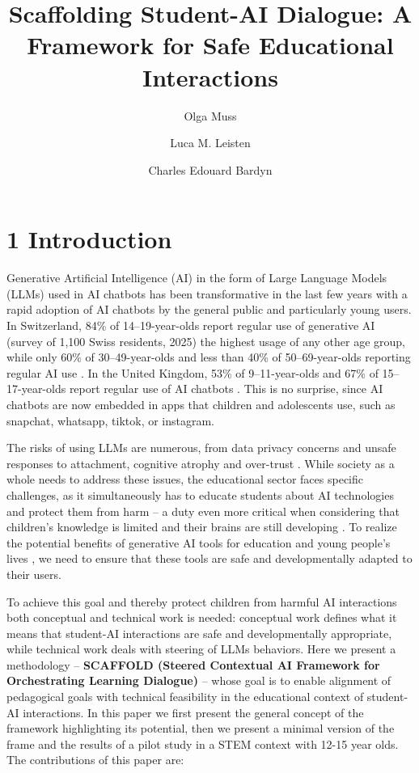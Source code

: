 \documentclass[fleqn,10pt]{wlscirep}
\title{Scaffolding Student-AI Dialogue: A Framework for Safe Educational Interactions}
\author[1,+]{Olga Muss}
\author[2,+]{Luca M. Leisten}
\author[3]{Charles Edouard Bardyn}
\affil[1]{Université de Neuchâtel, ETH Zurich}
\affil[2]{ETH Zurich}
\affil[3]{AI Swiss}
\affil[*]{luca.leisten@gess.ethz.ch, olga.muss@unine.ch}
\affil[+]{these authors contributed equally to this work}
\begin{document}
\flushbottom
\maketitle
\thispagestyle{empty}

\section*{1 Introduction}

Generative Artificial Intelligence (AI) in the form of Large Language Models (LLMs) used in AI chatbots has been transformative in the last few years with a rapid adoption of AI chatbots by the general public and particularly young users. In Switzerland, 84\% of 14–19-year-olds report regular use of generative AI (survey of 1,100 Swiss residents, 2025) the highest usage of any other age group, while only 60\% of 30–49-year-olds and less than 40\% of 50–69-year-olds reporting regular AI use \cite{WIP-CH2025}. In the United Kingdom, 53\% of 9–11-year-olds and 67\% of 15–17-year-olds report regular use of AI chatbots \cite{InternetMatters2025}. This is no surprise, since AI chatbots are now embedded in apps that children and adolescents use, such as snapchat, whatsapp, tiktok, or instagram.

The risks of using LLMs are numerous, from data privacy concerns and unsafe responses to attachment, cognitive atrophy and over-trust \cite{Neugnot2024, Kurian2025, UNESCO2021, VIOLA2017, Yu2025, Chandra2025}. While society as a whole needs to address these issues, the educational sector faces specific challenges, as it simultaneously has to educate students about AI technologies and protect them from harm \cite{UNCRC1989} – a duty even more critical when considering that children's knowledge is limited and their brains are still developing \cite{Gogtay2004}. To realize the potential benefits of generative AI tools for education and young people's lives \cite{UNESCO2021}, we need to ensure that these tools are safe and developmentally adapted to their users.

To achieve this goal and thereby protect children from harmful AI interactions both conceptual and technical work is needed: conceptual work defines what it means that student-AI interactions are safe and developmentally appropriate, while technical work deals with steering of LLMs behaviors. Here we present a methodology – \textbf{SCAFFOLD (Steered Contextual AI Framework for Orchestrating Learning Dialogue)} – whose goal is to enable alignment of pedagogical goals with technical feasibility in the educational context of student-AI interactions. In this paper we first present the general concept of the framework highlighting its potential, then we present a minimal version of the frame and the results of a pilot study in a STEM context with 12-15 year olds. The contributions of this paper are:
\end{document}
